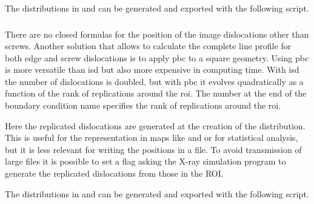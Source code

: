 The distributions in  and  can be generated and exported with the following script.

\smallskip


\newpage

\subsubsection{}

There are no closed formulas for the position of the image dislocations other than screws.
Another solution that allows to calculate the complete line profile for both edge and screw dislocations is to apply \gls{pbc} to a square geometry.
Using \gls{pbc} is more versatile than \gls{isd} but also more expensive in computing time.
With \gls{isd} the number of dislocations is doubled, but with \gls{pbc} it evolves quadratically as a function of the rank of replications around the \gls{roi}.
The number at the end of the boundary condition name specifies the rank of replications around the \gls{roi}.

\bigskip

Here the replicated dislocations are generated at the creation of the distribution.
This is useful for the representation in maps like  and  or for statistical analysis, but it is less relevant for writing the positions in a file.
To avoid transmission of large files it is possible to set a flag asking the X-ray simulation program to generate the replicated dislocations from those in the ROI.

%
%

\bigskip \bigskip

The distributions in  and  can be generated and exported with the following script.

\medskip


\newpage

\subsubsection{}

